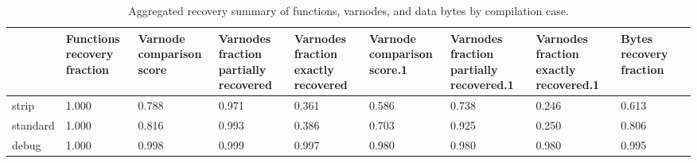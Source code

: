 \begin{table*}[tb]
\centering
\caption{Aggregated recovery summary of functions, varnodes, and data bytes by compilation case.}
\label{table:opts-overall-summary}
\begin{tabular}{lp{1.33cm}p{1.33cm}p{1.33cm}p{1.33cm}p{1.33cm}p{1.33cm}p{1.33cm}p{1.33cm}p{1.33cm}}
\toprule
{} & {Functions recovery fraction} & {Varnode comparison score} & {Varnodes fraction partially recovered} & {Varnodes fraction exactly recovered} & {Varnode comparison score.1} & {Varnodes fraction partially recovered.1} & {Varnodes fraction exactly recovered.1} & {Bytes recovery fraction} \\
\midrule
strip    &                                       1.000 &                                    0.788 &                                              0.971 &                                              0.361 &                                      0.586 &                                              0.738 &                                              0.246 &                                   0.613 \\
standard &                                       1.000 &                                    0.816 &                                              0.993 &                                              0.386 &                                      0.703 &                                              0.925 &                                              0.250 &                                   0.806 \\
debug    &                                       1.000 &                                    0.998 &                                              0.999 &                                              0.997 &                                      0.980 &                                              0.980 &                                              0.980 &                                   0.995 \\
\bottomrule
\end{tabular}
\end{table*}
